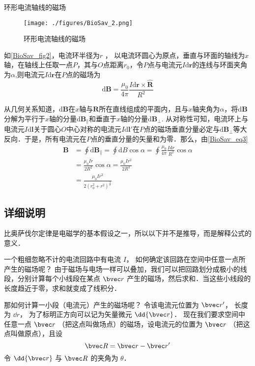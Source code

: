 \begin{example}{环形电流轴线的磁场}\label{BioSav_ex2}
\begin{figure}[ht]
\centering
\texttt{[image: ./figures/BioSav\_2.png]}
\caption{环形电流轴线的磁场} \label{BioSav_fig2}
\end{figure}
如\autoref{BioSav_fig2}，电流环半径为$r$ ， 以电流环圆心为原点，垂直与环面的轴线为$x$轴，在轴线上任取一点$P$，其与$O$点距离$r_0$，令$P$点与电流元$I\mathrm{d}\boldsymbol{r}$的连线与环面夹角为$\alpha$,则电流元$I\mathrm{d}\boldsymbol{r}$在$P$点的磁场为
\begin{equation}
\mathrm{d}\boldsymbol{B}=\frac{\mu_0}{4\pi}\frac{I\mathrm{d}\boldsymbol{r}\times\hat{\boldsymbol{R}}}{R^2}
\end{equation}

从几何关系知道，$\mathrm{d}\boldsymbol{B}$在$x$轴与$\boldsymbol{R}$所在直线组成的平面内，且与$x$轴夹角为$\alpha$，将$\mathrm{d}\boldsymbol{B}$分解为平行于$x$轴的分量$\mathrm{d}\boldsymbol{B_\parallel}$和垂直于$x$轴的分量$\mathrm{d}\boldsymbol{B_\bot}$. 从对称性可知，电流环上与电流元$I\mathrm{d}\boldsymbol{l}$关于圆心$O$中心对称的电流元$I\mathrm{d}\boldsymbol{l'}$在$P$点的磁场垂直分量必定与$\mathrm{d}\boldsymbol{B_\bot}$等大反向．于是，所有电流元在$P$点的垂直分量的矢量和为零．那么，由\autoref{BioSav_eq3} 
\begin{equation}
\begin{aligned}
\boldsymbol{B}&=\oint{\mathrm{d}\boldsymbol{B_\parallel}}=\oint\mathrm{d}B\cos{\alpha}=\oint\frac{\mu_0}{4\pi}\frac{I\mathrm{d}r}{R^2}\cos\alpha\\
&=\frac{\mu_0Ir}{2R^2}\cos\alpha=\frac{\mu_0Ir^2}{2R^3}\\
&=\frac{\mu_0Ir^2}{2(r_0^2+r^2)^{\frac{3}{2}}}
\end{aligned}
\end{equation}
\end{example}

\subsection{详细说明}
比奥萨伐尔定律是电磁学的基本假设之一，所以以下并不是推导，而是解释公式的意义．

一个粗细忽略不计的电流回路中有电流 $I$， 如何确定该回路在空间中任意一点所产生的磁场呢？ 由于磁场与电场一样可以叠加，我们可以把回路划分成极小的线段，分别计算每个小线段在某点 $\bvec r$ 产生的磁场，然后求和．当这些小线段的长度趋近于零，求和就变成了线积分．

那如何计算一小段（电流元）产生的磁场呢？ 令该电流元位置为 $\bvec r'$， 长度为 $\dd{r}$， 为了标明正方向可以记为矢量微元 $\dd{\bvec r}$． 现在我们要求空间中任意一点 $\bvec r$ （把这点叫做场点）的磁场，设电流元的位置为 $\bvec r$ （把这点叫做原点），且设
\begin{equation}
\bvec R = \bvec r - \bvec r'
\end{equation}
令 $\dd{\bvec r}$ 与 $\bvec R$ 的夹角为 $\theta$．


